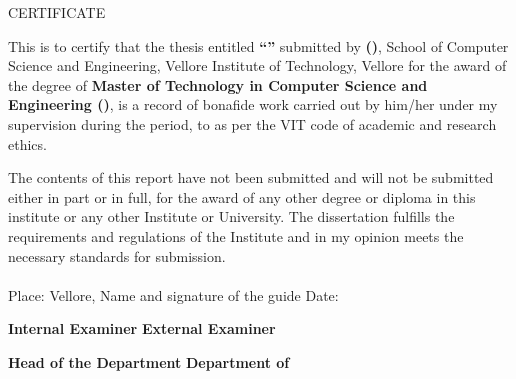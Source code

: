 \centering
\begin{center}
	\Large{CERTIFICATE}	
\end{center}
\vspace{1em}
\normalsize
\justifying
\begin{flushleft}
\justifying
This is to certify that the thesis entitled \textbf{``\thesistitle ''} submitted by \textbf{\studentname \; (\studentregno)}, School of Computer Science and Engineering, Vellore Institute of Technology, Vellore for the award of the degree of \textbf{Master of Technology in Computer Science and Engineering (\specialization)}, is a record of bonafide work carried out by him/her under my supervision during the period, \textbf{\projstartdate} to \textbf{\projenddate} as per the VIT code of academic and research ethics. \par

The contents of this report have not been submitted and will not be submitted either in part or in full, for the award of any other degree or diploma in this institute or any other Institute or University. The dissertation fulfills the requirements and regulations of the Institute and in my opinion meets the necessary standards for submission.	
\end{flushleft}
\paragraph{} 
\vspace{5cm}

\begin{flushleft}
    Place: Vellore, \hspace{7.5cm} Name and signature of the guide \linebreak
Date: \thesisdate \hspace{10.5cm} \linebreak
\end{flushleft}
\par
\vspace{4em} 
\textbf{Internal Examiner} \hspace{7.5cm} \textbf{External Examiner} \linebreak
\vspace{4em}
\begin{center}
	\textbf{Head of the Department} \linebreak
	\textbf{Department of \hoddept}
\end{center}
\pagebreak
